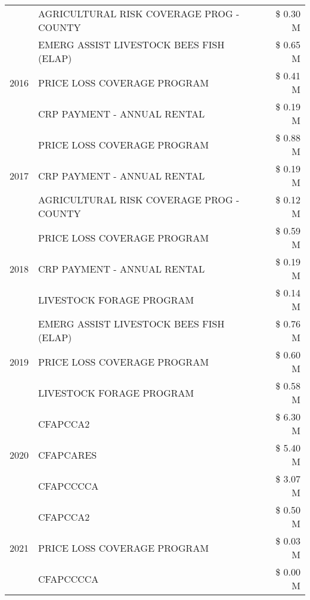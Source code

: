 \begin{tabular}{llr}
 & AGRICULTURAL RISK COVERAGE PROG - COUNTY & \$ 0.30 M \\
\cline{1-3}
\multirow[t]{3}{*}{2016} & EMERG ASSIST LIVESTOCK BEES FISH (ELAP) & \$ 0.65 M \\
 & PRICE LOSS COVERAGE PROGRAM & \$ 0.41 M \\
 & CRP PAYMENT - ANNUAL RENTAL & \$ 0.19 M \\
\cline{1-3}
\multirow[t]{3}{*}{2017} & PRICE LOSS COVERAGE PROGRAM & \$ 0.88 M \\
 & CRP PAYMENT - ANNUAL RENTAL & \$ 0.19 M \\
 & AGRICULTURAL RISK COVERAGE PROG - COUNTY & \$ 0.12 M \\
\cline{1-3}
\multirow[t]{3}{*}{2018} & PRICE LOSS COVERAGE PROGRAM & \$ 0.59 M \\
 & CRP PAYMENT - ANNUAL RENTAL & \$ 0.19 M \\
 & LIVESTOCK FORAGE PROGRAM & \$ 0.14 M \\
\cline{1-3}
\multirow[t]{3}{*}{2019} & EMERG ASSIST LIVESTOCK BEES FISH (ELAP) & \$ 0.76 M \\
 & PRICE LOSS COVERAGE PROGRAM & \$ 0.60 M \\
 & LIVESTOCK FORAGE PROGRAM & \$ 0.58 M \\
\cline{1-3}
\multirow[t]{3}{*}{2020} & CFAPCCA2 & \$ 6.30 M \\
 & CFAPCARES & \$ 5.40 M \\
 & CFAPCCCCA & \$ 3.07 M \\
\cline{1-3}
\multirow[t]{3}{*}{2021} & CFAPCCA2 & \$ 0.50 M \\
 & PRICE LOSS COVERAGE PROGRAM & \$ 0.03 M \\
 & CFAPCCCCA & \$ 0.00 M \\
\cline{1-3}
\bottomrule
\end{tabular}
